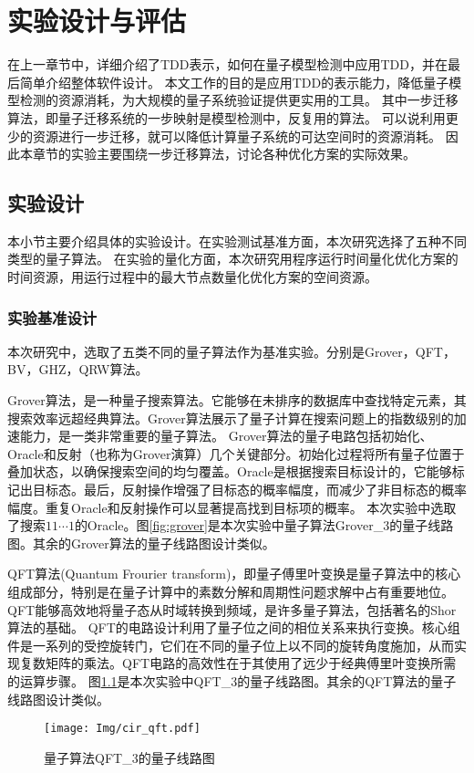\chapter{实验设计与评估}
\label{sec-ex}
在上一章节中，详细介绍了TDD表示，如何在量子模型检测中应用TDD，并在最后简单介绍整体软件设计。
本文工作的目的是应用TDD的表示能力，降低量子模型检测的资源消耗，为大规模的量子系统验证提供更实用的工具。
其中一步迁移算法，即量子迁移系统的一步映射是模型检测中，反复用的算法。
可以说利用更少的资源进行一步迁移，就可以降低计算量子系统的可达空间时的资源消耗。
因此本章节的实验主要围绕一步迁移算法，讨论各种优化方案的实际效果。
\section{实验设计}
本小节主要介绍具体的实验设计。在实验测试基准方面，本次研究选择了五种不同类型的量子算法。
在实验的量化方面，本次研究用程序运行时间量化优化方案的时间资源，用运行过程中的最大节点数量化优化方案的空间资源。
\subsection*{实验基准设计}
本次研究中，选取了五类不同的量子算法作为基准实验。分别是Grover，QFT，BV，GHZ，QRW算法。

Grover算法，是一种量子搜索算法\citep{Grover_1996}。它能够在未排序的数据库中查找特定元素，其搜索效率远超经典算法。Grover算法展示了量子计算在搜索问题上的指数级别的加速能力，是一类非常重要的量子算法。
Grover算法的量子电路包括初始化、Oracle和反射（也称为Grover演算）几个关键部分。初始化过程将所有量子位置于叠加状态，以确保搜索空间的均匀覆盖。Oracle是根据搜索目标设计的，它能够标记出目标态。最后，反射操作增强了目标态的概率幅度，而减少了非目标态的概率幅度。重复Oracle和反射操作可以显著提高找到目标项的概率。
本次实验中选取了搜索$11\cdots 1$的Oracle。图\ref{fig:grover}是本次实验中量子算法Grover\_3的量子线路图。其余的Grover算法的量子线路图设计类似。


QFT算法(Quantum Frourier transform)，即量子傅里叶变换是量子算法中的核心组成部分，特别是在量子计算中的素数分解和周期性问题求解中占有重要地位\citep{nielsen2010quantum}。QFT能够高效地将量子态从时域转换到频域，是许多量子算法，包括著名的Shor算法的基础。
QFT的电路设计利用了量子位之间的相位关系来执行变换。核心组件是一系列的受控旋转门，它们在不同的量子位上以不同的旋转角度施加，从而实现复数矩阵的乘法。QFT电路的高效性在于其使用了远少于经典傅里叶变换所需的运算步骤。
图\ref{fig:qft}是本次实验中QFT\_3的量子线路图。其余的QFT算法的量子线路图设计类似。
\begin{figure}[!htbp]
    \centering
    \texttt{[image: Img/cir\_qft.pdf]}
    \caption{量子算法QFT\_3的量子线路图}
    \label{fig:qft}
\end{figure} 


